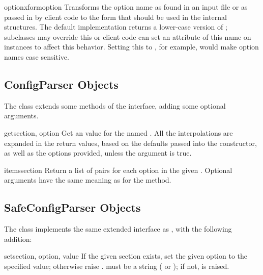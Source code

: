 \begin{methoddesc}{optionxform}{option}
Transforms the option name  as found in an input file or
as passed in by  client code to the form that should be used in the
internal structures.  The default implementation returns a lower-case
version of ; subclasses may override this or client code
can set an attribute of this name on instances to affect this
behavior.  Setting this to , for example, would make
option names case sensitive.
\end{methoddesc}


\subsection{ConfigParser Objects \label{ConfigParser-objects}}

The  class extends some methods of the
 interface, adding some optional arguments.

\begin{methoddesc}{get}{section, option}
Get an  value for the named .  All the
\character{\%} interpolations are expanded in the return values, based
on the defaults passed into the constructor, as well as the options
 provided, unless the  argument is true.
\end{methoddesc}

\begin{methoddesc}{items}{section}
Return a list of  pairs for each
option in the given . Optional arguments have the
same meaning as for the  method.
\end{methoddesc}


\subsection{SafeConfigParser Objects \label{SafeConfigParser-objects}}

The  class implements the same extended
interface as , with the following addition:

\begin{methoddesc}{set}{section, option, value}
If the given section exists, set the given option to the specified
value; otherwise raise .   must
be a string ( or ); if not,
 is raised.
\end{methoddesc}
